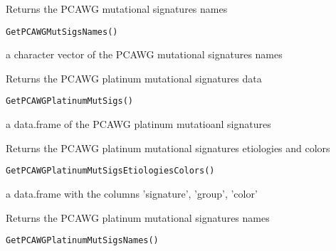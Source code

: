 \documentclass[letterpaper]{book}
\begin{document}
%
\begin{Description}\relax
Returns the PCAWG mutational signatures names
\end{Description}
%
\begin{Usage}
\begin{verbatim}
GetPCAWGMutSigsNames()
\end{verbatim}
\end{Usage}
%
\begin{Value}
a character vector of the PCAWG mutational signatures names
\end{Value}
%
\begin{Description}\relax
Returns the PCAWG platinum mutational signatures data
\end{Description}
%
\begin{Usage}
\begin{verbatim}
GetPCAWGPlatinumMutSigs()
\end{verbatim}
\end{Usage}
%
\begin{Value}
a data.frame of the PCAWG platinum mutatioanl signatures
\end{Value}
%
\begin{Description}\relax
Returns the PCAWG platinum mutational signatures etiologies and colors
\end{Description}
%
\begin{Usage}
\begin{verbatim}
GetPCAWGPlatinumMutSigsEtiologiesColors()
\end{verbatim}
\end{Usage}
%
\begin{Value}
a data.frame with the columns 'signature', 'group', 'color'
\end{Value}
%
\begin{Description}\relax
Returns the PCAWG platinum mutational signatures names
\end{Description}
%
\begin{Usage}
\begin{verbatim}
GetPCAWGPlatinumMutSigsNames()
\end{verbatim}
\end{Usage}
\end{document}
